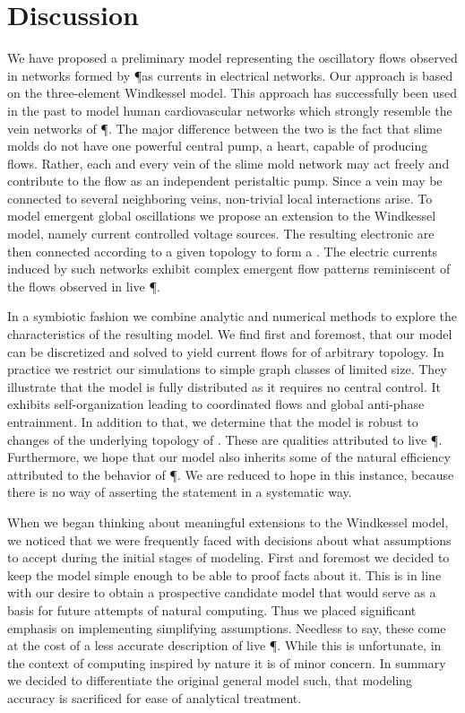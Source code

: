 \section{Discussion}

	We have proposed a preliminary model representing the oscillatory flows observed in networks formed by \P as currents in electrical networks. Our approach is based on the three-element Windkessel model. This approach has successfully been used in the past to model human cardiovascular networks which strongly resemble the vein networks of \P. The major difference between the two is the fact that slime molds do not have one powerful central pump, \ie a heart, capable of producing flows. Rather, each and every vein of the slime mold network may act freely and contribute to the flow as an independent peristaltic pump. Since a vein may be connected to several neighboring veins, non-trivial local interactions arise. To model emergent global oscillations we propose an extension to the Windkessel model, namely current controlled voltage sources. The resulting electronic \Pes are then connected according to a given topology to form a \Pn. The electric currents induced by such networks exhibit complex emergent flow patterns reminiscent of the flows observed in live \P.

	In a symbiotic fashion we combine analytic and numerical methods to explore the characteristics of the resulting model. We find first and foremost, that our model can be discretized and solved to yield current flows for \Pn of arbitrary topology. In practice we restrict our simulations to simple graph classes of limited size. They illustrate that the model is fully distributed as it requires no central control. It exhibits self-organization leading to coordinated flows and global anti-phase entrainment. In addition to that, we determine that the model is robust to changes of the underlying topology of \Pns. These are qualities attributed to live \P. Furthermore, we hope that our model also inherits some of the natural efficiency attributed to the behavior of \P. We are reduced to hope in this instance, because there is no way of asserting the statement in a systematic way.

	When we began thinking about meaningful extensions to the Windkessel model, we noticed that we were frequently faced with decisions about what assumptions to accept during the initial stages of modeling. First and foremost we decided to keep the model simple enough to be able to proof facts about it. This is in line with our desire to obtain a prospective candidate model that would serve as a basis for future attempts of natural computing. Thus we placed significant emphasis on implementing simplifying assumptions. Needless to say, these come at the cost of a less accurate description of live \P. While this is unfortunate, in the context of computing inspired by nature it is of minor concern. In summary we decided to differentiate the original general model such, that modeling accuracy is sacrificed for ease of analytical treatment.

